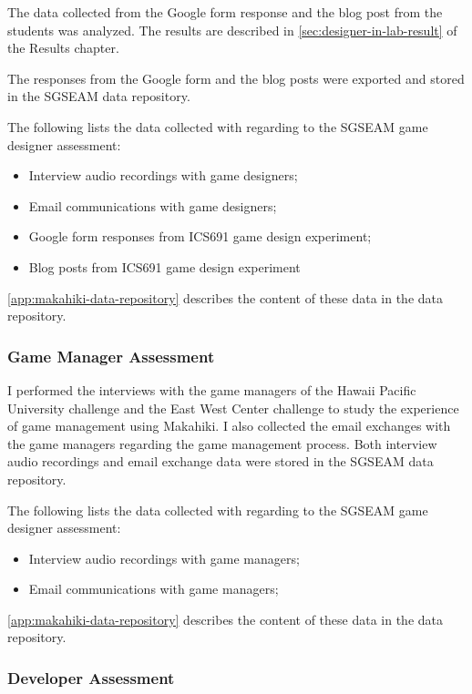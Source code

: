 The data collected from the Google form response and the blog post from the students was analyzed. The results are described in \autoref{sec:designer-in-lab-result} of the Results chapter.

The responses from the Google form and the blog posts were exported and stored in the SGSEAM data repository.

The following lists the data collected with regarding to the SGSEAM game designer assessment:

\begin{itemize}
\item Interview audio recordings with game designers;
\item Email communications with game designers;
\item Google form responses from ICS691 game design experiment; 
\item Blog posts from ICS691 game design experiment
\end{itemize}

\autoref{app:makahiki-data-repository} describes the content of these data in the data repository.

\subsubsection{Game Manager Assessment}

I performed the interviews with the game managers of the Hawaii Pacific University challenge and the East West Center challenge to study the experience of game management using Makahiki. I also collected the email exchanges with the game managers regarding the game management process. Both interview audio recordings and email exchange data were stored in the SGSEAM data repository.

The following lists the data collected with regarding to the SGSEAM game designer assessment:

\begin{itemize}
\item Interview audio recordings with game managers;
\item Email communications with game managers;
\end{itemize}

\autoref{app:makahiki-data-repository} describes the content of these data in the data repository.

\subsubsection{Developer Assessment}

